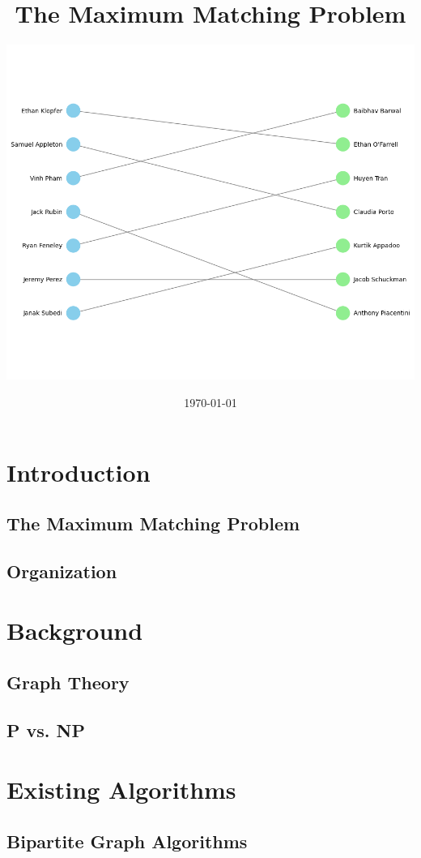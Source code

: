 \documentclass[condensed]{union-cs-thesis}
\title{The Maximum Matching Problem}
\author{\includegraphics[width=0.75\linewidth]{images/cover.png}}
\date{\today}
\begin{document}

\maketitle


\newpage
{\small
\tableofcontents}
\newpage

\makepreamble


\chapter{Introduction}
\label{sec:introduction}


\section{The Maximum Matching Problem}
\label{sec:max_matching}


\section{Organization}
\label{sec:organization}


\chapter{Background}
\label{sec:background}


\section{Graph Theory}
\label{sec:graph_theory}


\section{P vs. NP}
\label{sec:P_vs_NP}


\chapter{Existing Algorithms}
\label{sec:existing_algorithms}

\section{Bipartite Graph Algorithms}
\label{sec:bipartite_algorithms}
\end{document}
